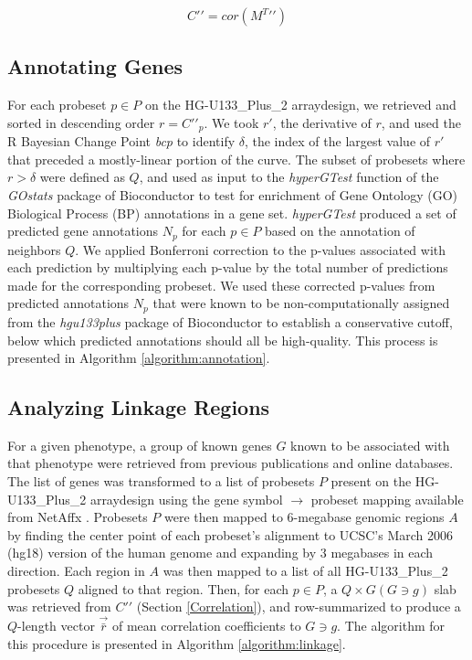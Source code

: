 \documentclass{bioinfo}
\begin{document}
\begin{methods}
\begin{equation}\label{equation:cprimeprime}
C\prime\prime = cor({M^T}\prime\prime)
\end{equation}

\subsection{Annotating Genes}\label{Annotation Methods}

For each probeset $p \in P$ on the HG-U133\_Plus\_2 arraydesign, we retrieved
and sorted in descending order $r = C{\prime\prime}_p$.  We took $r\prime$, the
derivative of $r$, and used the R Bayesian Change Point \emph{bcp} to identify
$\delta$, the index of the largest value of $r\prime$ that preceded a
mostly-linear portion of the curve.
The subset of probesets where $r > \delta$ were defined as $Q$, and used as
input to the \emph{hyperGTest} function of the \emph{GOstats} package of
Bioconductor \cite{bioconductor} to test for enrichment of Gene Ontology (GO)
Biological Process (BP) annotations in a gene set.  \emph{hyperGTest} produced
a set of predicted gene annotations $N_p$ for each $p \in P$ based on the
annotation of neighbors $Q$.  We applied Bonferroni correction to the p-values
associated with each prediction by multiplying each p-value by the total number
of predictions made for the corresponding probeset.  We used these corrected
p-values from predicted annotations $N_p$ that were known to be
non-computationally assigned from the \emph{hgu133plus} package of Bioconductor
\cite{bioconductor} to establish a conservative cutoff, below which predicted
annotations should all be high-quality.  This process is presented in Algorithm
\ref{algorithm:annotation}.

\subsection{Analyzing Linkage Regions}\label{Linkage}

For a given phenotype, a group of known genes $G$ known to be associated with
that phenotype were retrieved from previous publications and online databases.
The list of genes was transformed to a list of probesets $P$ present on the
HG-U133\_Plus\_2 arraydesign using the gene symbol $\rightarrow$ probeset
mapping available from NetAffx \cite{netaffx}.  Probesets $P$ were then mapped
to 6-megabase genomic regions $A$ by finding the center point of each
probeset's alignment to UCSC's March 2006 (hg18) version of the human genome
and expanding by 3 megabases in each direction.  Each region in $A$ was then
mapped to a list of all HG-U133\_Plus\_2 probesets $Q$ aligned to that region.
Then, for each $p \in P$, a $Q{\times} G(G \ni g)$ slab was retrieved from
$C\prime\prime$ (Section \ref{Correlation}), and row-summarized to produce a
$Q$-length vector $\vec{\bar{r}}$ of mean correlation coefficients to $G \ni
g$.  The algorithm for this procedure is presented in Algorithm
\ref{algorithm:linkage}.

\end{methods}
\end{document}

